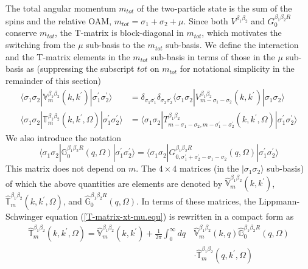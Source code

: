 \documentclass[aps,prb,superscriptaddress,letterpaper,amsmath,amssymb,twocolumn,preprintnumbers]{revtex4}
\begin{document}
\begin{widetext}
\begin{align}
\end{align}
%
The total angular momentum $m_{tot}$ of the two-particle state is the sum of the spins and the relative OAM, $m_{tot}=\sigma_1+\sigma_2+\mu$. Since both $V^{\beta_1 \beta_2}$ and $G^{\beta_1 \beta_2 R}_{0}$ conserve $m_{tot}$, the T-matrix is block-diagonal in $m_{tot}$, which motivates the switching from the $\mu$ sub-basis to the $m_{tot}$ sub-basis. We define the interaction and the T-matrix elements in the $m_{tot}$ sub-basis in terms of those in the $\mu$ sub-basis as
%
(suppressing the subscript $tot$ on $m_{tot}$ for notational simplicity in the remainder of this section)
%
\begin{align}
\langle \sigma_1 \sigma_2 | \mathbb{V}^{\beta_1 \beta_2}_m (k , k^{\prime}) | \sigma^{\prime}_1 \sigma^{\prime}_2 \rangle &= \delta_{\sigma_1 \sigma^{\prime}_1} \delta_{\sigma_2 \sigma^{\prime}_2} \langle \sigma_1 \sigma_2 | V^{\beta_1 \beta_2}_{m - \sigma_1 - \sigma_2} (k , k^{\prime}) | \sigma_1 \sigma_2 \rangle \\
\langle \sigma_1 \sigma_2 | \mathbb{T}^{\beta_1 \beta_2}_{m} (k , k^{\prime}, \Omega) | \sigma^{\prime}_1 \sigma^{\prime}_2 \rangle &= \langle \sigma_1 \sigma_2 | T^{\beta_1 \beta_2}_{m  - \sigma_1 - \sigma_2 , m  - \sigma^{\prime}_1 - \sigma^{\prime}_2} (k , k^{\prime}, \Omega) | \sigma^{\prime}_1 \sigma^{\prime}_2 \rangle
\end{align}
We also introduce the notation
\begin{equation}
\langle \sigma_1 \sigma_2 | \mathbb{G}^{\beta_1 \beta_2 R}_{0} (q , \Omega) | \sigma^{\prime}_1 \sigma^{\prime}_2 \rangle = \langle \sigma_1 \sigma_2 | G^{\beta_1 \beta_2 R}_{0 , \sigma^{\prime}_1 + \sigma^{\prime}_2 - \sigma_1 - \sigma_2} (q , \Omega) | \sigma^{\prime}_1 \sigma^{\prime}_2 \rangle
\end{equation}
This matrix does not depend on $m$. The $4 \times 4$ matrices (in the $| \sigma_1 \sigma_2 \rangle$ sub-basis) of which the above quantities are elements are denoted by $\hat{\mathbb{V}}^{\beta_1 \beta_2}_m (k , k^{\prime})$, $\hat{\mathbb{T}}^{\beta_1 \beta_2}_{m} (k , k^{\prime}, \Omega)$, and $\hat{\mathbb{G}}^{\beta_1 \beta_2 R}_{0} (q , \Omega)$. In terms of these matrices, the Lippmann-Schwinger equation (\ref{T-matrix-xt-mu.equ}) is rewritten in a compact form as
\begin{align}
\hat{\mathbb{T}}^{\beta_1 \beta_2}_{m} ( k,k^{\prime}, \Omega) = \hat{\mathbb{V}}^{\beta_1 \beta_2}_{m} (k,k^{\prime})
+ \frac {1} {2 \pi} \int^{\infty}_{0} d q \, &\hat{\mathbb{V}}^{\beta_1 \beta_2}_{m} (k,q) \hat{\mathbb{G}}^{\beta_1 \beta_2 R}_{0} (q,\Omega) \nonumber \\
\label{T-matrix-xt-m.equ}
&\cdot \hat{\mathbb{T}}^{\beta_1 \beta_2}_{m} (q,k^{\prime}, \Omega)
\end{align}
\end{widetext}
\end{document}
